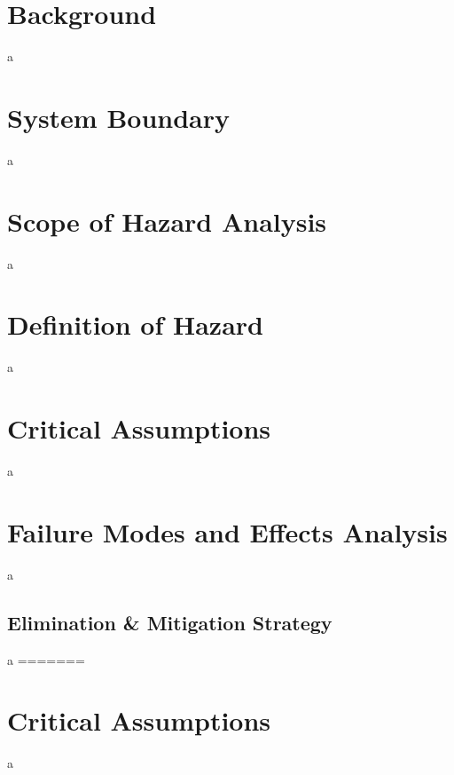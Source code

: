 \documentclass[12pt]{article}
\begin{document}
\section{Background}
a

\section{System Boundary}
a

\section{Scope of Hazard Analysis}
a

\section{Definition of Hazard}
a

\section{Critical Assumptions}
a

\section{Failure Modes and Effects Analysis}
a

	\subsection{Elimination \& Mitigation Strategy}
	a
=======
\section{Critical Assumptions}
a
	
\end{document}
